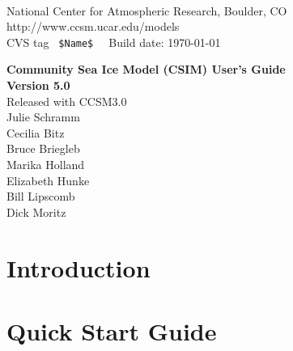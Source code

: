 \documentclass[]{article}
\begin{document}

 \newenvironment{Ventry}[1]%
   {\begin{list}{}{\renewcommand{\makelabel}[1]{\textsf{##1:}\hfil}%
      \settowidth{\labelwidth}{\textsf{#1:}}%
      \setlength{\leftmargin}{1.5cm}%
      \setlength{\labelwidth}{1.0cm}%
      \setlength{\itemsep}{0pt}%
      \setlength{\parsep}{0pt}}}%
   {\end{list}}

\begin{titlepage}

 \\
\noindent National Center for Atmospheric Research, Boulder, CO \\
\noindent http://www.ccsm.ucar.edu/models \\
\noindent CVS tag \verb+ $Name$  +  Build date: \today \\
\vspace{2in}

\begin{center}
{\Large
  {\bf Community Sea Ice Model (CSIM) User's Guide} \\
  {\bf Version 5.0} \\
  \vspace{0.2in}
  {Released with CCSM3.0} \\
  \vspace{0.5in}
  Julie Schramm \\
  Cecilia Bitz  \\
  Bruce Briegleb \\
  Marika Holland \\
  Elizabeth Hunke \\
  Bill Lipscomb \\
  Dick Moritz \\
}
\end{center}

\end{titlepage}

\tableofcontents

\newpage
\section{Introduction}
  

\section{Quick Start Guide}
  \label{quick_start}
  
\end{document}
